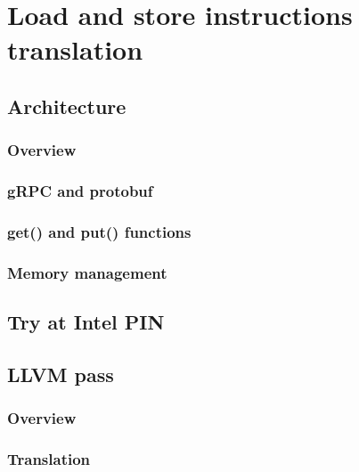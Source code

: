 \documentclass[bsc,frontabs,twoside,singlespacing,parskip,deptreport]{infthesis}     %
\begin{document}


\chapter{Load and store instructions translation}

\section{Architecture}

\subsection{Overview}

\subsection{gRPC and protobuf}

\subsection{get() and put() functions}

\subsection{Memory management}

\section{Try at Intel PIN}

\section{LLVM pass}

\subsection{Overview}

\subsection{Translation}
\end{document}
